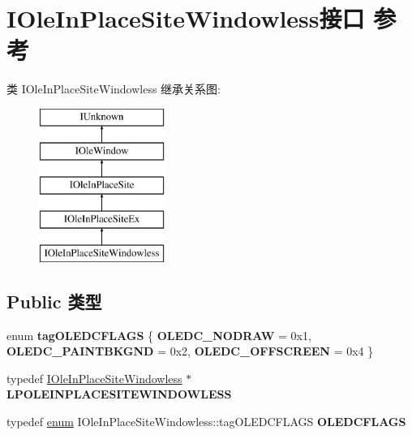 \hypertarget{interface_i_ole_in_place_site_windowless}{}\section{I\+Ole\+In\+Place\+Site\+Windowless接口 参考}
\label{interface_i_ole_in_place_site_windowless}
类 I\+Ole\+In\+Place\+Site\+Windowless 继承关系图\+:\begin{figure}[H]
\begin{center}
\leavevmode
\includegraphics[height=5.000000cm]{interface_i_ole_in_place_site_windowless}
\end{center}
\end{figure}
\subsection*{Public 类型}
\begin{DoxyCompactItemize}
\item 
\mbox{\label{interface_i_ole_in_place_site_windowless_a91cb3c04a79f04e46f2d33926beb66de}} 
enum {\bfseries tag\+O\+L\+E\+D\+C\+F\+L\+A\+GS} \{ {\bfseries O\+L\+E\+D\+C\+\_\+\+N\+O\+D\+R\+AW} = 0x1, 
{\bfseries O\+L\+E\+D\+C\+\_\+\+P\+A\+I\+N\+T\+B\+K\+G\+ND} = 0x2, 
{\bfseries O\+L\+E\+D\+C\+\_\+\+O\+F\+F\+S\+C\+R\+E\+EN} = 0x4
 \}
\item 
\mbox{\label{interface_i_ole_in_place_site_windowless_a813f5fa16d4b27ef6a8fed9cd479abba}} 
typedef \hyperlink{interface_i_ole_in_place_site_windowless}{I\+Ole\+In\+Place\+Site\+Windowless} $\ast$ {\bfseries L\+P\+O\+L\+E\+I\+N\+P\+L\+A\+C\+E\+S\+I\+T\+E\+W\+I\+N\+D\+O\+W\+L\+E\+SS}
\item 
\mbox{\label{interface_i_ole_in_place_site_windowless_ac35b49ced21b843d09dd26d8666464a8}} 
typedef \hyperlink{interfaceenum}{enum} I\+Ole\+In\+Place\+Site\+Windowless\+::tag\+O\+L\+E\+D\+C\+F\+L\+A\+GS {\bfseries O\+L\+E\+D\+C\+F\+L\+A\+GS}
\end{DoxyCompactItemize}
